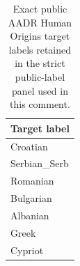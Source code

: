 \begin{table}[!htbp]
\centering
\caption{Exact public AADR Human Origins target labels retained in the strict public-label panel used in this comment.}
\label{tab:target-panel}
\small
\begin{tabular}{l}
\toprule
Target label \\
\midrule
Croatian \\
Serbian\_Serb \\
Romanian \\
Bulgarian \\
Albanian \\
Greek \\
Cypriot \\
\bottomrule
\end{tabular}
\end{table}
